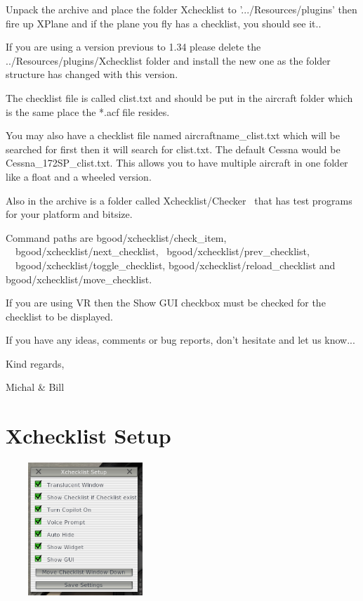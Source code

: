 \documentclass[11pt,parskip=half,a4paper]{scrartcl}
\begin{document}
Unpack the archive and place the folder Xchecklist to '.../Resources/plugins' then fire up XPlane and if the plane you fly has a checklist, you should see it.. \newline

If you are using a version previous to 1.34 please delete the ../Resources/plugins/Xchecklist folder and install the new one as the folder structure has changed with this version. \newline 

The checklist file is called clist.txt and should be put in the aircraft folder which is the same place the *.acf file resides. \newline

You may also have a checklist file named aircraftname\_clist.txt which will be searched for first then it will search for clist.txt. The default Cessna would be Cessna\_172SP\_clist.txt. This allows you to have multiple aircraft in one folder like a float and a wheeled version. \newline

Also in the archive is a folder called Xchecklist/Checker \ that has test programs for your platform and bitsize. \newline

Command paths are bgood/xchecklist/check\_item, \ \ bgood/xchecklist/next\_checklist, \ bgood/xchecklist/prev\_checklist, \ \ bgood/xchecklist/toggle\_checklist, bgood/xchecklist/reload\_checklist and bgood/xchecklist/move\_checklist. \newline

If you are using VR then the Show GUI checkbox must be checked for the checklist to be displayed. \newline

If you have any ideas, comments or bug reports, don't hesitate and let us know... \newline

Kind regards, \newline

Michal \& Bill \newline

\newpage
\section{Xchecklist Setup}

\begin{center}
\includegraphics[width=6cm, height=5cm]{XchecklistSetup.png}
\end{center}
\end{document}
